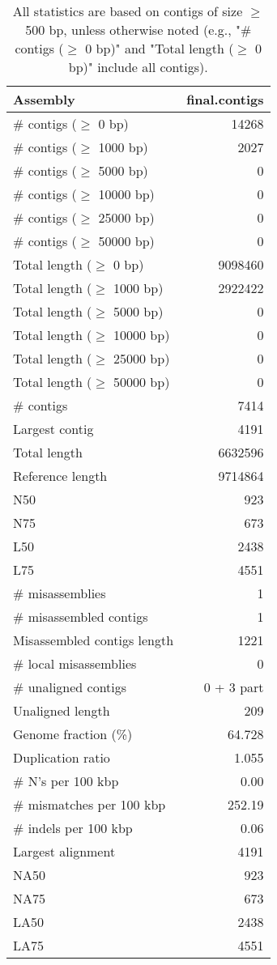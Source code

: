 \documentclass[12pt,a4paper]{article}
\begin{document}
\begin{table}[ht]
\begin{center}
\caption{All statistics are based on contigs of size $\geq$ 500 bp, unless otherwise noted (e.g., "\# contigs ($\geq$ 0 bp)" and "Total length ($\geq$ 0 bp)" include all contigs).}
\begin{tabular}{|l*{1}{|r}|}
\hline
Assembly & final.contigs \\ \hline
\# contigs ($\geq$ 0 bp) & 14268 \\ \hline
\# contigs ($\geq$ 1000 bp) & 2027 \\ \hline
\# contigs ($\geq$ 5000 bp) & 0 \\ \hline
\# contigs ($\geq$ 10000 bp) & 0 \\ \hline
\# contigs ($\geq$ 25000 bp) & 0 \\ \hline
\# contigs ($\geq$ 50000 bp) & 0 \\ \hline
Total length ($\geq$ 0 bp) & 9098460 \\ \hline
Total length ($\geq$ 1000 bp) & 2922422 \\ \hline
Total length ($\geq$ 5000 bp) & 0 \\ \hline
Total length ($\geq$ 10000 bp) & 0 \\ \hline
Total length ($\geq$ 25000 bp) & 0 \\ \hline
Total length ($\geq$ 50000 bp) & 0 \\ \hline
\# contigs & 7414 \\ \hline
Largest contig & 4191 \\ \hline
Total length & 6632596 \\ \hline
Reference length & 9714864 \\ \hline
N50 & 923 \\ \hline
N75 & 673 \\ \hline
L50 & 2438 \\ \hline
L75 & 4551 \\ \hline
\# misassemblies & 1 \\ \hline
\# misassembled contigs & 1 \\ \hline
Misassembled contigs length & 1221 \\ \hline
\# local misassemblies & 0 \\ \hline
\# unaligned contigs & 0 + 3 part \\ \hline
Unaligned length & 209 \\ \hline
Genome fraction (\%) & 64.728 \\ \hline
Duplication ratio & 1.055 \\ \hline
\# N's per 100 kbp & 0.00 \\ \hline
\# mismatches per 100 kbp & 252.19 \\ \hline
\# indels per 100 kbp & 0.06 \\ \hline
Largest alignment & 4191 \\ \hline
NA50 & 923 \\ \hline
NA75 & 673 \\ \hline
LA50 & 2438 \\ \hline
LA75 & 4551 \\ \hline
\end{tabular}
\end{center}
\end{table}
\end{document}
